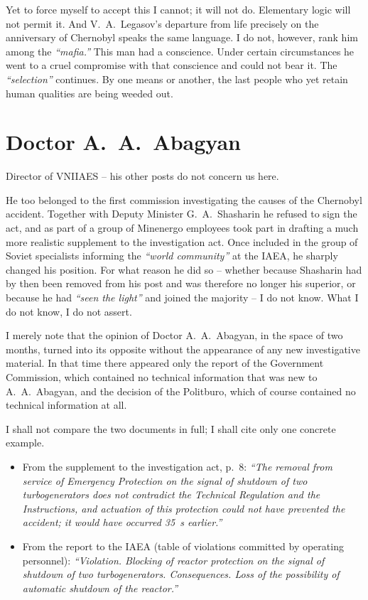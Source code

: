 \documentclass[openright]{bookest}
\begin{document}
Yet to force myself to accept this I cannot; it will not do. Elementary logic will not permit it. And V.~A.~Legasov's departure from life precisely on the anniversary of Chernobyl speaks the same language. I do not, however, rank him among the \textit{``mafia.''} This man had a conscience. Under certain circumstances he went to a cruel compromise with that conscience and could not bear it. The \textit{``selection''} continues. By one means or another, the last people who yet retain human qualities are being weeded out.

\section{Doctor A.~A.~Abagyan}

Director of VNIIAES -- his other posts do not concern us here.

He too belonged to the first commission investigating the causes of the Chernobyl accident. Together with Deputy Minister G.~A.~Shasharin he refused to sign the act, and as part of a group of Minenergo employees took part in drafting a much more realistic supplement to the investigation act. Once included in the group of Soviet specialists informing the \textit{``world community''} at the IAEA, he sharply changed his position. For what reason he did so -- whether because Shasharin had by then been removed from his post and was therefore no longer his superior, or because he had \textit{``seen the light''} and joined the majority -- I do not know. What I do not know, I do not assert.

I merely note that the opinion of Doctor A.~A.~Abagyan, in the space of two months, turned into its opposite without the appearance of any new investigative material. In that time there appeared only the report of the Government Commission, which contained no technical information that was new to A.~A.~Abagyan, and the decision of the Politburo, which of course contained no technical information at all.

I shall not compare the two documents in full; I shall cite only one concrete example.

\begin{itemize}
\item From the supplement to the investigation act, p.~8: \textit{``The removal from service of Emergency Protection on the signal of shutdown of two turbogenerators does not contradict the Technical Regulation and the Instructions, and actuation of this protection could not have prevented the accident; it would have occurred \qty{35}{\second} earlier.''}

\item From the report to the IAEA (table of violations committed by operating personnel): \textit{``Violation. Blocking of reactor protection on the signal of shutdown of two turbogenerators. Consequences. Loss of the possibility of automatic shutdown of the reactor.''}
\end{itemize}
\end{document}
